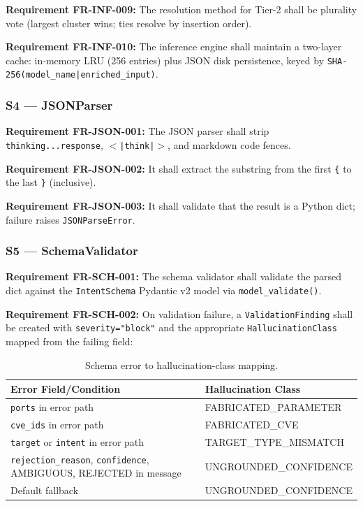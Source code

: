 \documentclass[10pt,journal,onecolumn]{IEEEtran}
\newcommand{\reqid}[1]{\textbf{#1}}
\begin{document}
\reqid{Requirement FR-INF-009:} The resolution method for Tier-2 shall be plurality vote (largest cluster wins; ties resolve by insertion order).

\reqid{Requirement FR-INF-010:} The inference engine shall maintain a two-layer cache: in-memory LRU (256 entries) plus JSON disk persistence, keyed by \texttt{SHA-256(model\_name|enriched\_input)}.

\subsubsection{S4 --- JSONParser}
\reqid{Requirement FR-JSON-001:} The JSON parser shall strip \texttt{ thinking...response}, \texttt{$<$|think|$>$}, and markdown code fences.

\reqid{Requirement FR-JSON-002:} It shall extract the substring from the first \texttt{\{} to the last \texttt{\}} (inclusive).

\reqid{Requirement FR-JSON-003:} It shall validate that the result is a Python dict; failure raises \texttt{JSONParseError}.

\subsubsection{S5 --- SchemaValidator}
\reqid{Requirement FR-SCH-001:} The schema validator shall validate the parsed dict against the \texttt{IntentSchema} Pydantic v2 model via \texttt{model\_validate()}.

\reqid{Requirement FR-SCH-002:} On validation failure, a \texttt{ValidationFinding} shall be created with \texttt{severity="block"} and the appropriate \texttt{HallucinationClass} mapped from the failing field:
\begin{table}[t]
\caption{Schema error to hallucination-class mapping.}
\label{tab:schmap}
\begin{tabularx}{\textwidth}{>{\ttfamily}l >{\ttfamily}X}
\toprule
\textbf{Error Field/Condition} & \textbf{Hallucination Class}\\
\midrule
\texttt{ports} in error path & FABRICATED\_PARAMETER\\
\texttt{cve\_ids} in error path & FABRICATED\_CVE\\
\texttt{target} or \texttt{intent} in error path & TARGET\_TYPE\_MISMATCH\\
\texttt{rejection\_reason}, \texttt{confidence}, AMBIGUOUS, REJECTED in message & UNGROUNDED\_CONFIDENCE\\
Default fallback & UNGROUNDED\_CONFIDENCE\\
\bottomrule
\end{tabularx}
\end{table}
\end{document}
